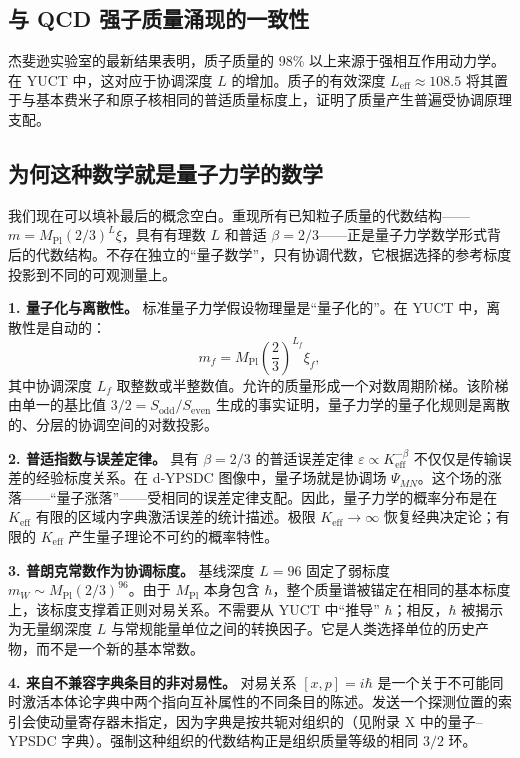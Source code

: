 \documentclass[11pt,a4paper]{article}
\begin{document}
	\subsection{与 QCD 强子质量涌现的一致性}
	
	杰斐逊实验室的最新结果表明，质子质量的 98\% 以上来源于强相互作用动力学。在 YUCT 中，这对应于协调深度 \(L\) 的增加。质子的有效深度 \(L_{\mathrm{eff}} \approx 108.5\) 将其置于与基本费米子和原子核相同的普适质量标度上，证明了质量产生普遍受协调原理支配。
	
	\subsection{为何这种数学就是量子力学的数学}
	\label{subsec:QM-as-YUCT}
	
	我们现在可以填补最后的概念空白。重现所有已知粒子质量的代数结构——\(m = M_{\mathrm{Pl}}(2/3)^L\xi\)，具有有理数 $L$ 和普适 $\beta=2/3$——正是量子力学数学形式背后的代数结构。不存在独立的“量子数学”，只有协调代数，它根据选择的参考标度投影到不同的可观测量上。
	
	\medskip
	\noindent\textbf{1. 量子化与离散性。}
	标准量子力学假设物理量是“量子化的”。在 YUCT 中，离散性是自动的：
	\[
	m_f = M_{\mathrm{Pl}} \left( \frac{2}{3} \right)^{L_f} \xi_f,
	\]
	其中协调深度 $L_f$ 取整数或半整数值。允许的质量形成一个对数周期阶梯。该阶梯由单一的基比值 $3/2 = S_{\mathrm{odd}}/S_{\mathrm{even}}$ 生成的事实证明，量子力学的量子化规则是离散的、分层的协调空间的对数投影。
	
	\medskip
	\noindent\textbf{2. 普适指数与误差定律。}
	具有 $\beta = 2/3$ 的普适误差定律 $\varepsilon \propto K_{\mathrm{eff}}^{-\beta}$ 不仅仅是传输误差的经验标度关系。在 d‑YPSDC 图像中，量子场就是协调场 $\Psi_{MN}$。这个场的涨落——“量子涨落”——受相同的误差定律支配。因此，量子力学的概率分布是在 $K_{\mathrm{eff}}$ 有限的区域内字典激活误差的统计描述。极限 $K_{\mathrm{eff}}\to\infty$ 恢复经典决定论；有限的 $K_{\mathrm{eff}}$ 产生量子理论不可约的概率特性。
	
	\medskip
	\noindent\textbf{3. 普朗克常数作为协调标度。}
	基线深度 $L=96$ 固定了弱标度 $m_W \sim M_{\mathrm{Pl}}(2/3)^{96}$。由于 $M_{\mathrm{Pl}}$ 本身包含 $\hbar$，整个质量谱被锚定在相同的基本标度上，该标度支撑着正则对易关系。不需要从 YUCT 中“推导” $\hbar$；相反，$\hbar$ 被揭示为无量纲深度 $L$ 与常规能量单位之间的转换因子。它是人类选择单位的历史产物，而不是一个新的基本常数。
	
	\medskip
	\noindent\textbf{4. 来自不兼容字典条目的非对易性。}
	对易关系 $[x,p]=i\hbar$ 是一个关于不可能同时激活本体论字典中两个指向互补属性的不同条目的陈述。发送一个探测位置的索引会使动量寄存器未指定，因为字典是按共轭对组织的（见附录 X 中的量子–YPSDC 字典）。强制这种组织的代数结构正是组织质量等级的相同 $3/2$ 环。
	
\end{document}
